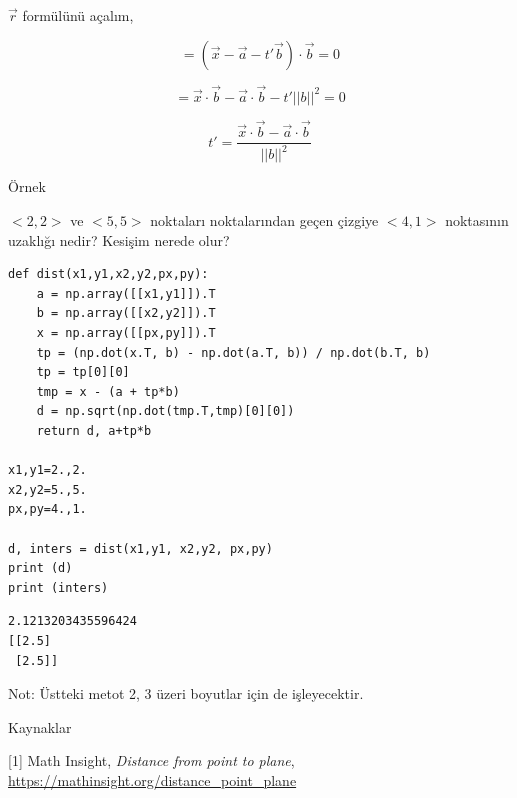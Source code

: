 \documentclass[12pt,fleqn]{article}\usepackage{../../common}
\begin{document}
$\vec{r}$ formülünü açalım,

$$
= (\vec{x} - \vec{a} - t' \vec{b}) \cdot \vec{b} = 0
$$

$$
= \vec{x}\cdot\vec{b} - \vec{a}\cdot\vec{b} - t'||b||^2 = 0
$$

$$
t' = \frac{\vec{x}\cdot\vec{b} - \vec{a}\cdot\vec{b}}{||b||^2}
$$

Örnek

$< 2,2 >$ ve $< 5,5 >$ noktaları noktalarından geçen çizgiye $< 4,1 >$ noktasının
uzaklığı nedir? Kesişim nerede olur?

\begin{verbatim}
def dist(x1,y1,x2,y2,px,py):
    a = np.array([[x1,y1]]).T
    b = np.array([[x2,y2]]).T
    x = np.array([[px,py]]).T
    tp = (np.dot(x.T, b) - np.dot(a.T, b)) / np.dot(b.T, b)
    tp = tp[0][0]
    tmp = x - (a + tp*b)
    d = np.sqrt(np.dot(tmp.T,tmp)[0][0])
    return d, a+tp*b

x1,y1=2.,2.
x2,y2=5.,5.
px,py=4.,1.

d, inters = dist(x1,y1, x2,y2, px,py)
print (d)
print (inters)
\end{verbatim}

\begin{verbatim}
2.1213203435596424
[[2.5]
 [2.5]]
\end{verbatim}

Not: Üstteki metot 2, 3 üzeri boyutlar için de işleyecektir. 

Kaynaklar

[1] Math Insight, {\em Distance from point to plane},
    \url{https://mathinsight.org/distance_point_plane}
\end{document}
